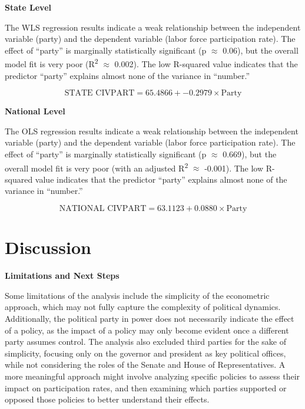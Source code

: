 \textbf{State Level}

The WLS regression results indicate a  weak relationship between the independent variable (party) and the dependent variable (labor force participation rate). The effect of ``party'' is marginally statistically significant (p $\approx$ 0.06), but the overall model fit is very poor (R\textsuperscript{2} $\approx$ 0.002). The low R-squared value indicates that the predictor ``party'' explains almost none of the variance in ``number.''

\begin{equation}
\text{STATE CIVPART} = 65.4866 + -0.2979 \times \text{Party}
\end{equation}

\textbf{National Level}

The OLS regression results indicate a  weak relationship between the independent variable (party) and the dependent variable (labor force participation rate). The effect of ``party'' is marginally statistically significant (p $\approx$ 0.669), but the overall model fit is very poor (with an adjusted R\textsuperscript{2} $\approx$ -0.001). The low R-squared value indicates that the predictor ``party'' explains almost none of the variance in ``number.''

\begin{equation}
\text{NATIONAL CIVPART} = 63.1123 + 0.0880 \times \text{Party}
\end{equation}

\section{Discussion}

\textbf{Limitations and Next Steps}

Some limitations of the analysis include the simplicity of the econometric approach, which may not fully capture the complexity of political dynamics. Additionally, the political party in power does not necessarily indicate the effect of a policy, as the impact of a policy may only become evident once a different party assumes control. The analysis also excluded third parties for the sake of simplicity, focusing only on the governor and president as key political offices, while not considering the roles of the Senate and House of Representatives. A more meaningful approach might involve analyzing specific policies to assess their impact on participation rates, and then examining which parties supported or opposed those policies to better understand their effects.